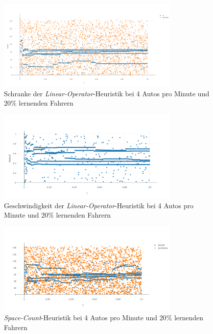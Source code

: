 \begin{figure}[H]
	\includegraphics[width=0.8\textwidth]{analyse/SomeMutants/4pm/linop.png}
	\caption{Schranke der \emph{Linear-Operator}-Heuristik bei 4 Autos pro Minute und $20\%$ lernenden Fahrern}\label{fig:ap_pm_loz_4}
\end{figure}
\begin{figure}[H]
	\includegraphics[width=0.8\textwidth]{analyse/SomeMutants/4pm/linopa4some.png}
	\caption{Geschwindigkeit der \emph{Linear-Operator}-Heuristik bei 4 Autos pro Minute und $20\%$ lernenden Fahrern}\label{fig:ap_pm_loa_4}
\end{figure}
\begin{figure}[H]
	\includegraphics[width=0.8\textwidth]{analyse/SomeMutants/4pm/space4some.png}
	\caption{\emph{Space-Count}-Heuristik bei 4 Autos pro Minute und $20\%$ lernenden Fahrern}\label{fig:ap_pm_sc_4}
\end{figure}
